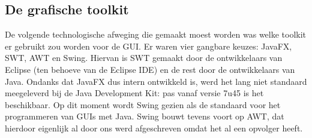 \documentclass[a4paper,11pt]{article}
\begin{document}
\subsection{De grafische toolkit}
De volgende technologische afweging die gemaakt moest worden was welke toolkit er gebruikt zou worden voor de GUI. Er waren vier gangbare keuzes: JavaFX, SWT, AWT en Swing. Hiervan is SWT gemaakt door de ontwikkelaars van Eclipse (ten behoeve van de Eclipse IDE) en de rest door de ontwikkelaars van Java. Ondanks dat JavaFX dus intern ontwikkeld is, werd het lang niet standaard meegeleverd bij de Java Development Kit: pas vanaf versie 7u45 is het beschikbaar. Op dit moment wordt Swing gezien als de standaard voor het programmeren van GUIs met Java. Swing bouwt tevens voort op AWT, dat hierdoor eigenlijk al door ons werd afgeschreven omdat het al een opvolger heeft.\\
\end{document}
